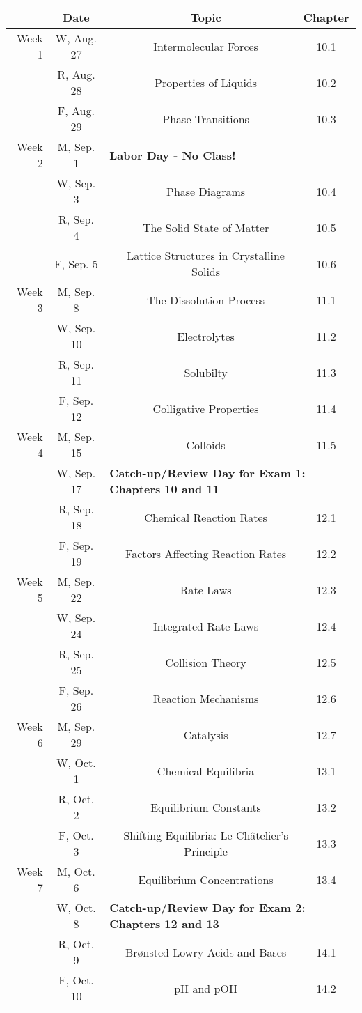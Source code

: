 \begin{tabular}{rcccc}
& Date && Topic & Chapter\\
\midrule
Week 1 & W, Aug. 27&& Intermolecular Forces & 10.1\\
& R, Aug. 28&& Properties of Liquids & 10.2\\
& F, Aug. 29&& Phase Transitions & 10.3\\
\midrule
Week 2 & M, Sep. 1& \multicolumn{3}{l}{\textbf{Labor Day - No Class!}}\\
& W, Sep. 3&& Phase Diagrams & 10.4\\
& R, Sep. 4&& The Solid State of Matter & 10.5\\
& F, Sep. 5&& Lattice Structures in Crystalline Solids & 10.6\\
\midrule
Week 3 & M, Sep. 8&& The Dissolution Process & 11.1\\
& W, Sep. 10&& Electrolytes & 11.2\\
& R, Sep. 11&& Solubilty & 11.3\\
& F, Sep. 12&& Colligative Properties & 11.4\\
\midrule
Week 4 & M, Sep. 15&& Colloids & 11.5\\
& W, Sep. 17& \multicolumn{3}{l}{\textbf{Catch-up/Review Day for Exam 1: Chapters 10 and 11}}\\
& R, Sep. 18&& Chemical Reaction Rates & 12.1\\
& F, Sep. 19&& Factors Affecting Reaction Rates & 12.2\\
\midrule
Week 5 & M, Sep. 22&& Rate Laws & 12.3\\
& W, Sep. 24&& Integrated Rate Laws & 12.4\\
& R, Sep. 25&& Collision Theory & 12.5\\
& F, Sep. 26&& Reaction Mechanisms & 12.6\\
\midrule
Week 6 & M, Sep. 29&& Catalysis & 12.7\\
& W, Oct. 1&& Chemical Equilibria & 13.1\\
& R, Oct. 2&& Equilibrium Constants & 13.2\\
& F, Oct. 3&& Shifting Equilibria: Le Ch\^atelier's Principle & 13.3\\
\midrule
Week 7 & M, Oct. 6&& Equilibrium Concentrations & 13.4\\
& W, Oct. 8& \multicolumn{3}{l}{\textbf{Catch-up/Review Day for Exam 2: Chapters 12 and 13}}\\
& R, Oct. 9&& Brønsted-Lowry Acids and Bases & 14.1\\
& F, Oct. 10&& pH and pOH & 14.2\\

\end{tabular}
